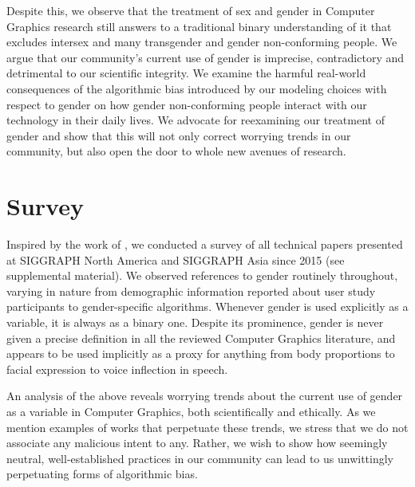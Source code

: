 \documentclass[nonacm,sigconf,review,balance=false]{acmart}
\begin{document}
Despite this, we observe that the treatment of sex and gender in Computer Graphics research
still answers to a traditional binary understanding of it that excludes intersex and many transgender and
gender non-conforming people. We argue that our community's current use of gender is
imprecise, contradictory and detrimental to our scientific integrity.
We examine the harmful real-world consequences of the algorithmic bias introduced by our modeling
choices with respect to gender on how gender non-conforming people interact with
our technology in their daily lives. We advocate for reexamining our
treatment of gender and show that this will not only correct worrying trends in
our community, but also open the door to whole new avenues of research.

\section{Survey}


Inspired by the work of \citet{keyes2018misgendering}, we conducted a survey of
all technical papers presented at SIGGRAPH North America and SIGGRAPH Asia since
2015 (see supplemental material). We observed references to gender routinely
throughout, varying in nature from demographic information reported about user
study participants to gender-specific algorithms. Whenever gender is used
explicitly as a variable, it is always as a binary one. Despite its prominence,
gender is never given a precise definition in all the reviewed Computer Graphics
literature, and appears to be used implicitly as a proxy for anything from body
proportions to facial expression to voice inflection in speech.

An analysis of the above reveals worrying trends about the current use of gender
as a variable in Computer Graphics, both scientifically and ethically. As we
mention examples of works that perpetuate these trends, we stress that we do not
associate any malicious intent to any. Rather, we wish to show how seemingly
neutral, well-established practices in our community can lead to us unwittingly
perpetuating forms of algorithmic bias.
\end{document}
